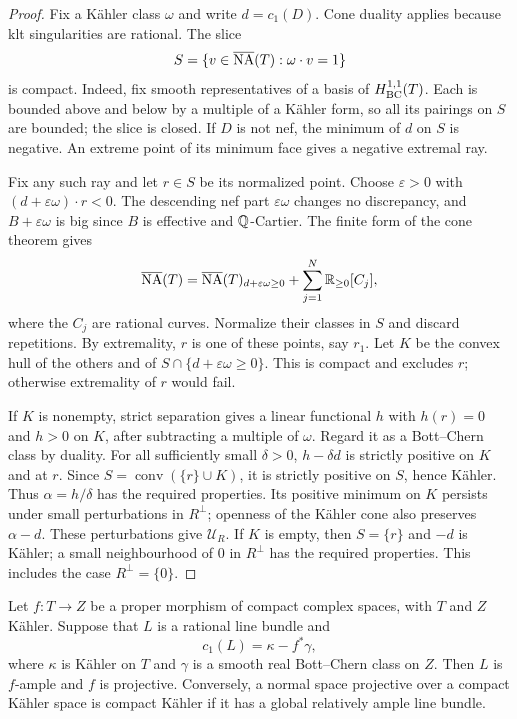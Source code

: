 \begin{proof}
Fix a K\"ahler class $\omega$ and write $d=c_1(D)$.  Cone duality applies
because klt singularities are rational.  The slice
\[
 S=\{v\in\overline{\mathrm{NA}}(T):\omega\cdot v=1\}
\]
is compact.  Indeed, fix smooth representatives of a basis of $H^{1,1}_{\mathrm{BC}}(T)$.
Each is bounded above and below by a multiple of a K\"ahler form, so all
its pairings on $S$ are bounded; the slice is closed.  If $D$ is not nef,
the minimum of $d$ on $S$ is negative.  An extreme point of its minimum
face gives a negative extremal ray.

Fix any such ray and let $r\in S$ be its normalized point.  Choose
$\varepsilon>0$ with $(d+\varepsilon\omega)\cdot r<0$.  The descending
nef part $\varepsilon\omega$ changes no discrepancy, and
$B+\varepsilon\omega$ is big since $B$ is effective and $\mathbb Q$-Cartier.
The finite form of the cone theorem gives
\begin{equation}\label{eq:absolute-finite-cone}
 \overline{\mathrm{NA}}(T)=\overline{\mathrm{NA}}(T)_{d+\varepsilon\omega\geq0}
       +\sum_{j=1}^{N}\mathbb R_{\geq0}[C_j],
\end{equation}
where the $C_j$ are rational curves.  Normalize their classes in $S$
and discard repetitions.  By extremality, $r$ is one of these points,
say $r_1$.  Let $K$ be the convex hull of the others and of
$S\cap\{d+\varepsilon\omega\geq0\}$.  This is compact and excludes
$r$; otherwise extremality of $r$ would fail.

If $K$ is nonempty, strict separation gives a linear functional $h$
with $h(r)=0$ and $h>0$ on $K$, after subtracting a multiple of $\omega$.
Regard it as a Bott--Chern class by duality.  For all sufficiently small
$\delta>0$, $h-\delta d$ is strictly positive on $K$ and at $r$.
Since $S=\operatorname{conv}(\{r\}\cup K)$, it is strictly positive on
$S$, hence K\"ahler.  Thus $\alpha=h/\delta$ has the required properties.
Its positive minimum on $K$ persists under small perturbations in
$R^\perp$; openness of the K\"ahler cone also preserves
$\alpha-d$.  These perturbations give $\mathcal U_R$.  If $K$ is empty,
then $S=\{r\}$ and $-d$ is K\"ahler; a small neighbourhood of $0$ in
$R^\perp$ has the required properties.  This includes the case
$R^\perp=\{0\}$.
\end{proof}

\begin{lemma}\label{lem:relative-positivity}
Let $f:T\to Z$ be a proper morphism of compact complex spaces, with $T$
and $Z$ K\"ahler.  Suppose that $L$ is a rational line bundle and
\[
 c_1(L)=\kappa-f^*\gamma,
\]
where $\kappa$ is K\"ahler on $T$ and $\gamma$ is a smooth real
Bott--Chern class on $Z$.  Then $L$ is $f$-ample and $f$ is projective.
Conversely, a normal space projective over a compact K\"ahler space is
compact K\"ahler if it has a global relatively ample line bundle.
\end{lemma}

